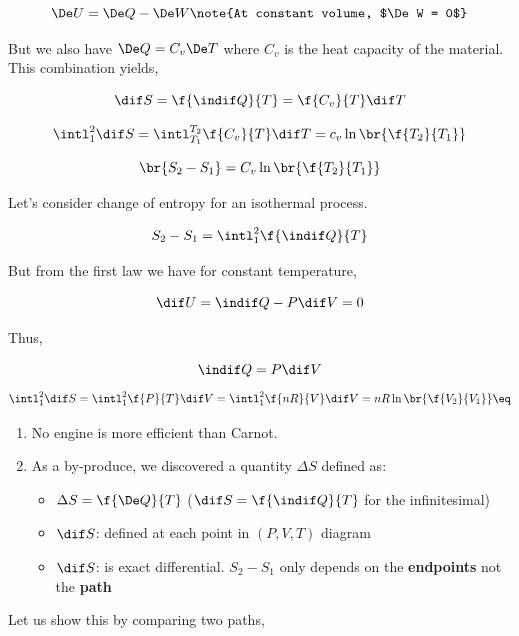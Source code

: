 \documentclass{article}
\begin{document}
\[ \De U = \De Q - \De W \note{At constant volume, $\De W = 0$} \]

But we also have $\De Q = C_v \De T$ where $C_v$ is the heat capacity of the material. This combination yields,

\[ \dif S = \f{\indif Q}{T} = \f{C_v}{T}\dif T \]

\[ \intl_1^2 \dif S = \intl_{T_1}^{T_2} \f{C_v}{T} \dif T = c_v \ln\br{\f{T_2}{T_1}} \]

\[ \br{S_2 - S_1} = C_v \ln\br{\f{T_2}{T_1}} \]


Let's consider change of entropy for an isothermal process.

\[ S_2 - S_1 = \intl_1^2 \f{\indif Q}{T} \]

But from the first law we have for constant temperature,

\[ \dif U = \indif Q - P \dif V = 0  \]

Thus,

\[ \indif Q = P \dif V \]
\[ \intl_1^2 \dif S = \intl_1^2 \f{P}{T}\dif V = \intl_1^2 \f{nR}{V}\dif V = nR \ln\br{\f{V_2}{V_1}} \eq \label{eq:isothermvolumechangeentropy} \]


\begin{enumerate}
        \item No engine is more efficient than Carnot.
        \item As a by-produce, we discovered a quantity $\Delta S$ defined as:
        \begin{itemize}
                \item $\Delta S = \f{\De Q}{T}$ ($\dif S = \f{\indif Q}{T}$ for the infinitesimal)
                \item $\dif S$: defined at each point in $(P,V,T)$ diagram
                \item $\dif S$: is exact differential. $S_2 - S_1$ only depends on the \textbf{endpoints} not the \textbf{path}
        \end{itemize}
\end{enumerate}

Let us show this by comparing two paths,
\end{document}

